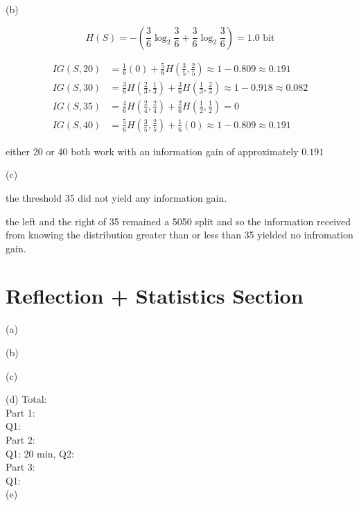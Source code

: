 \documentclass{report}
\begin{document}
(b)

$$H(S) = -\left(\frac{3}{6}\log_2\frac{3}{6} + \frac{3}{6}\log_2\frac{3}{6}\right) = 1.0 \text{ bit}$$

\begin{equation}\begin{split}
        IG(S,20) &= \frac{1}{6}(0) + \frac{5}{6}H(\frac{3}{5}, \frac{2}{5}) \approx  1 - 0.809 \approx 0.191\\
        IG(S,30) &= \frac{3}{6}H(\frac{2}{3}, \frac{1}{3}) + \frac{3}{6}H(\frac{1}{3}, \frac{2}{3}) \approx 1 - 0.918 \approx  0.082\\
        IG(S,35) &=\frac{4}{6}H(\frac{2}{4}, \frac{2}{4}) + \frac{2}{6}H(\frac{1}{2}, \frac{1}{2}) = 0\\
        IG(S,40) &=\frac{5}{6}H(\frac{3}{5}, \frac{2}{5}) + \frac{1}{6}(0)\approx 1 - 0.809 \approx 0.191
\end{split}
\end{equation}

either 20 or 40 both work with an information gain of approximately \(0.191\)

(c)

the threshold 35 did not yield any information gain. 

the left and the right of 35 remained a 5050 split and so the information received from knowing the distribution greater than or less than 35 yielded no infromation gain. 

\section*{Reflection + Statistics Section}
(a)

(b) 

(c) 

(d) Total: \\

Part 1: \\
Q1: \\

Part 2: \\
Q1: 20 min, Q2: \\

Part 3: \\
Q1: \\

(e)
\end{document}
